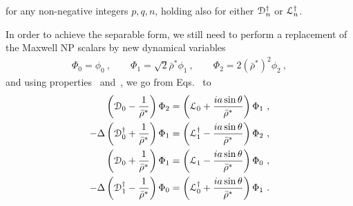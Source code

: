 for any non-negative integers $p,q,n$, holding also for either $\EuScript{D}^\dagger_n$ or $\EuScript{L}^\dagger_n$.

In order to achieve the separable form, we still need to perform a replacement of the Maxwell NP scalars by new dynamical variables
\begin{align}
    \label{eq3:phiBarRhoToPhi}
    \Phi_0 = \phi_0 ~,\qquad \Phi_1 = \sqrt{2} \bar{\rho}^* \phi_1 ~,\qquad \Phi_2 = 2 (\bar{\rho}^*)^2 \phi_2  ~,
\end{align}
and using properties~ and~, we go from Eqs.~ to
\begin{subequations}
    \begin{align}
        \label{eq3:D0Phi2L0Phi1}
        \left( \EuScript{D}_0 - \frac{1}{\bar{\rho}^*} \right) \Phi_2 &= \left( \EuScript{L}_0 + \frac{i a \sin\theta}{\bar{\rho}^*} \right) \Phi_1 ~, \\
        \label{eq3:Dd0Phi1Ld1Phi2}
        - \Delta \left( \EuScript{D}^\dagger_0 + \frac{1}{\bar{\rho}^*} \right) \Phi_1 &= \left( \EuScript{L}^\dagger_1 - \frac{i a \sin\theta}{\bar{\rho}^*} \right) \Phi_2 ~, \\
        \label{eq3:D0Phi1L1Phi0}
        \left( \EuScript{D}_0 + \frac{1}{\bar{\rho}^*} \right) \Phi_1 &= \left( \EuScript{L}_1 - \frac{i a \sin\theta}{\bar{\rho}^*} \right) \Phi_0 ~, \\
        \label{eq3:Dd1Phi0Ld0Phi1}
        - \Delta \left( \EuScript{D}^\dagger_1 - \frac{1}{\bar{\rho}^*} \right) \Phi_0 &= \left( \EuScript{L}^\dagger_0 + \frac{i a \sin\theta}{\bar{\rho}^*} \right) \Phi_1 ~.
    \end{align}
    \label{eq3:AllDPhiLPhi}
\end{subequations}


